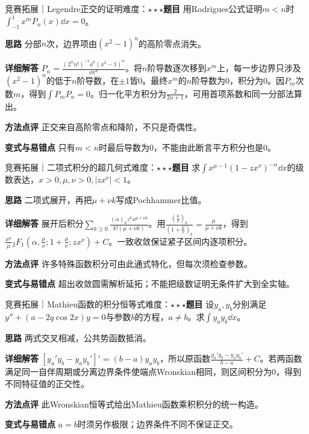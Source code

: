 \begin{example}{竞赛拓展｜Legendre正交的证明}{难度：$\star\star\star$}\label{deep:ex:integral_special_deep:legendreproof}\textbf{题目} 用Rodrigues公式证明$m<n$时$\int_{-1}^1x^mP_n(x)\dd x=0$。\par\textbf{思路} 分部$n$次，边界项由$(x^2-1)^n$的高阶零点消失。\par\textbf{详细解答} $P_n=\frac{(2^nn!)^{-1}\dd^n(x^2-1)^n}{\dd x^n}$。将$n$阶导数逐次移到$x^m$上，每一步边界只涉及$(x^2-1)^n$的低于$n$阶导数，在$\pm1$皆0。最终$x^m$的$n$阶导数为0，积分为0。因$P_m$次数$m$，得到$\int P_mP_n=0$。归一化平方积分为$\frac{2}{2n+1}$，可用首项系数和同一分部法算出。\par\textbf{方法点评} 正交来自高阶零点和降阶，不只是奇偶性。\par\textbf{变式与易错点} 只有$m<n$时最后导数为0，不能由此断言平方积分也是0。\end{example}

\begin{example}{竞赛拓展｜二项式积分的超几何式}{难度：$\star\star\star$}\label{deep:ex:integral_special_deep:hypergeneral}\textbf{题目} 求$\int x^{\mu-1}(1-zx^\nu)^{-\alpha}\dd x$的级数表达，$x>0,\mu,\nu>0,|zx^\nu|<1$。\par\textbf{思路} 二项式展开，再把$\mu+\nu k$写成Pochhammer比值。\par\textbf{详细解答} 展开后积分$\sum_{k\ge0}\frac{(\alpha)_kz^kx^{\mu+\nu k}}{k!(\mu+\nu k)}$。用$\frac{(\frac{\mu}{\nu})_k}{(1+\frac{\mu}{\nu})_k}=\frac{\mu}{\mu+\nu k}$，得到$\frac{x^\mu}{\mu}{}_2F_1(\alpha,\frac{\mu}{\nu};1+\frac{\mu}{\nu};zx^\nu)+C$。一致收敛保证紧子区间内逐项积分。\par\textbf{方法点评} 许多特殊函数积分可由此通式特化，但每次须检查参数。\par\textbf{变式与易错点} 超出收敛圆需解析延拓；不能把级数证明无条件扩大到全实轴。\end{example}

\begin{example}{竞赛拓展｜Mathieu函数的积分恒等式}{难度：$\star\star\star$}\label{deep:ex:integral_special_deep:mathieu}\textbf{题目} 设$y_a,y_b$分别满足$y''+(a-2q\cos2x)y=0$与参数$b$的方程，$a\ne b$。求$\int y_ay_b\dd x$。\par\textbf{思路} 两式交叉相减，公共势函数抵消。\par\textbf{详细解答} $[y_a'y_b-y_ay_b']'=(b-a)y_ay_b$，所以原函数$\frac{y_a'y_b-y_ay_b'}{b-a}+C$。若两函数满足同一自伴周期或分离边界条件使端点Wronskian相同，则区间积分为0，得到不同特征值的正交性。\par\textbf{方法点评} 此Wronskian恒等式给出Mathieu函数乘积积分的统一构造。\par\textbf{变式与易错点} $a=b$时须另作极限；边界条件不同不保证正交。\end{example}

